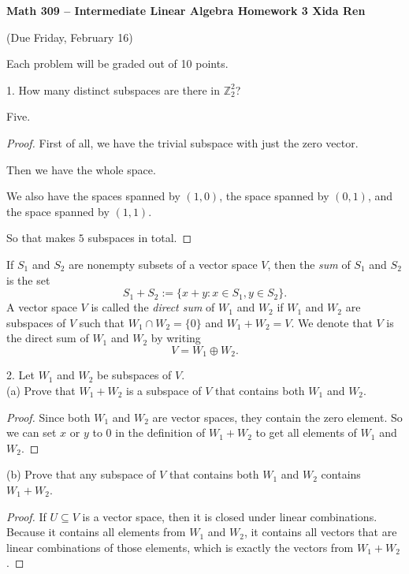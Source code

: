 \documentclass[12pt]{article} %
\newcommand{\Z}{\mathbb{Z}}
\begin{document}
 
\noindent
\textbf{Math 309 -- Intermediate Linear Algebra \quad 
Homework 3 \hfill Xida Ren}\\
\begin{center}
  (Due Friday, February 16)
\end{center}
\medskip

Each problem will be graded out of 10 points.

\vspace{1cm}

\begin{flushleft}

1.  How many distinct subspaces are there in $\Z_2^2$?

Five.

\begin{proof}
    First of all, we have the trivial subspace with just the zero vector.
    
    Then we have the whole space.
    
    We also have the spaces spanned by $(1, 0)$, the space spanned by $(0, 1)$, and the space spanned by $(1, 1)$.
    
    So that makes $5$ subspaces in total.
\end{proof}

\pagebreak

If $S_1$ and $S_2$ are nonempty subsets of a vector space $V$, then the \textit{sum} of $S_1$ and $S_2$ is the set
\[S_1 + S_2 := \{x + y : x \in S_1, y \in S_2\}.\]
A vector space $V$ is called the \textit{direct sum} of $W_1$ and $W_2$ if $W_1$ and $W_2$ are subspaces of $V$ such that $W_1 \cap W_2 = \{0\}$ and $W_1 + W_2 = V$.  We denote that $V$ is the direct sum of $W_1$ and $W_2$ by writing 
\[V = W_1 \oplus W_2.\]

\vspace{.5cm}

2.  Let $W_1$ and $W_2$ be subspaces of $V$.\\
(a) Prove that $W_1 + W_2$ is a subspace of $V$ that contains both $W_1$ and $W_2$.\\
\begin{proof}
    Since both $W_1$ and $W_2$ are vector spaces, they contain the zero element. So we can set $x$ or $y$ to $0$ in the definition of $W_1 + W_2$ to get all elements of $W_1$ and $W_2$.
\end{proof}
(b) Prove that any subspace of $V$ that contains both $W_1$ and $W_2$ contains $W_1 + W_2$.\\
\begin{proof}
    If $U\subseteq V$ is a vector space, then it is closed under linear combinations. Because it contains all elements from $W_1$ and $W_2$, it contains all vectors that are linear combinations of those elements, which is exactly the vectors from $W_1 + W_2$.
\end{proof}


\end{flushleft}
\end{document}
